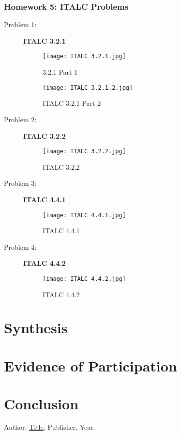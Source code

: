 \documentclass{article}
\theoremstyle{theorem}
\theoremstyle{definition}
\theoremstyle{remark}
\begin{document}
\subsubsection{Homework 5: ITALC Problems}
\begin{description}
\item[Problem 1: ] \textbf{ITALC 3.2.1 }\\
\begin{figure}
    \centering
    \texttt{[image: ITALC 3.2.1.jpg]}
    \caption{3.2.1 Part 1}
    \label{fig:enter-label}
\end{figure}

\begin{figure}
    \centering
    \texttt{[image: ITALC 3.2.1.2.jpg]}
    \caption{ITALC 3.2.1 Part 2}
    \label{fig:enter-label}
\end{figure}

\item[Problem 2: ] \textbf{ITALC 3.2.2 }\\

\begin{figure}
    \centering
    \texttt{[image: ITALC 3.2.2.jpg]}
    \caption{ITALC 3.2.2}
    \label{fig:enter-label}
\end{figure}

\item[Problem 3: ] \textbf{ITALC 4.4.1 }\\

\begin{figure}
    \centering
    \texttt{[image: ITALC 4.4.1.jpg]}
    \caption{ITALC 4.4.1}
    \label{fig:enter-label}
\end{figure}

\item[Problem 4: ] \textbf{ITALC 4.4.2 }\\
\begin{figure}
    \centering
    \texttt{[image: ITALC 4.4.2.jpg]}
    \caption{ITALC 4.4.2}
    \label{fig:enter-label}
\end{figure}

\end{description}


\section{Synthesis}

\section{Evidence of Participation}

\section{Conclusion}\label{conclusion}

\begin{thebibliography}{99}
 Author, \href{https://en.wikipedia.org/wiki/LaTeX}{Title}, Publisher, Year.
\end{thebibliography}
\end{document}
